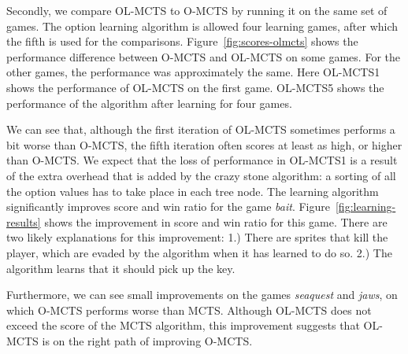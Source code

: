 Secondly, we compare OL-MCTS to O-MCTS by running it on the same set of games.
The option learning algorithm is allowed four learning games, after which the
fifth is used for the comparisons. Figure~\ref{fig:scores-olmcts} shows the
performance difference between O-MCTS and OL-MCTS on some games. For the other
games, the performance was approximately the same. Here OL-MCTS1 shows the
performance of OL-MCTS on the first game. OL-MCTS5 shows the performance of the
algorithm after learning for four games. 

We can see that, although the first iteration of OL-MCTS sometimes performs a
bit worse than O-MCTS, the fifth iteration often scores at least as high, or
higher than O-MCTS\@. We expect that the loss of performance in OL-MCTS1 is
a result of the extra overhead that is added by the crazy stone algorithm: a
sorting of all the option values has to take place in each tree node. The
learning algorithm significantly improves score and win ratio for the game
\textit{bait}.
Figure~\ref{fig:learning-results} shows the improvement in score and win ratio
for this game. There are two likely explanations for this improvement: 1.) There
are sprites that kill the player, which are evaded by the algorithm when it has
learned to do so.  2.) The algorithm learns that it should pick up the key.

Furthermore, we can see small improvements on the games \textit{seaquest} and
\textit{jaws}, on which O-MCTS performs worse than MCTS\@.  Although OL-MCTS
does not exceed the score of the MCTS algorithm, this improvement suggests
that OL-MCTS is on the right path of improving O-MCTS\@.

